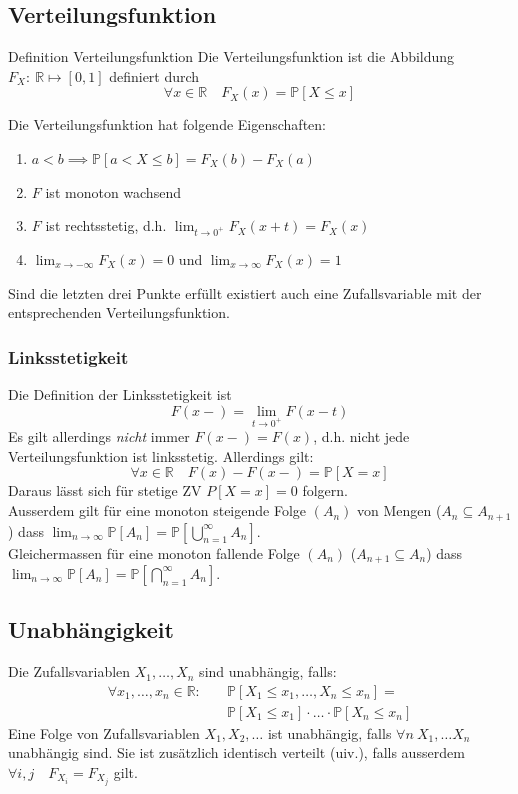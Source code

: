 \documentclass[a4paper,10pt]{article}
\def\R{\mathbb{R}}
\def\P{\mathbb{P}}
\begin{document}
\subsection{Verteilungsfunktion}
\begin{mainbox}{Definition Verteilungsfunktion}
	Die Verteilungsfunktion ist die Abbildung \(F_X: \ \R \mapsto [0,1]\) definiert durch
	\[\forall x \in \R \quad F_X(x) = \P[X \le x]\]
\end{mainbox}
Die Verteilungsfunktion hat folgende Eigenschaften:
\begin{enumerate}
	\item \(a < b \implies \P[a < X \le b] = F_X(b) - F_X(a)\)
	\item \(F\) ist monoton wachsend
	\item \(F\) ist rechtsstetig, d.h. \(\lim_{t \to 0^+} F_X(x+t) = F_X(x)\)
	\item \(\lim_{x\to - \infty} F_X(x) = 0\) und \(\lim_{x\to \infty} F_X(x) = 1\)
\end{enumerate}

Sind die letzten drei Punkte erfüllt existiert auch eine Zufallsvariable mit der entsprechenden Verteilungsfunktion.

\subsubsection*{Linksstetigkeit}
Die Definition der Linksstetigkeit ist
\[F(x-) = \lim_{t \to 0^+} F(x-t)\]
Es gilt allerdings \textit{nicht} immer \(F(x-) = F(x)\), d.h. nicht jede Verteilungsfunktion ist linksstetig. Allerdings gilt:
\[\forall x \in \R \quad F(x) - F(x-) = \P[X=x]\]
Daraus lässt sich für stetige ZV \(P[X=x] = 0\) folgern.\\
Ausserdem gilt für eine monoton steigende Folge $(A_n)$ von Mengen ($A_n \subseteq A_{n+1}$) dass $\lim_{n \to \infty} \P[A_n] = \P[\bigcup_{n=1}^\infty A_n]$.\\
Gleichermassen für eine monoton fallende Folge $(A_n)$ ($A_{n+1} \subseteq A_n$) dass $\lim_{n \to \infty} \P[A_n] = \P[\bigcap_{n=1}^\infty A_n]$.

\subsection{Unabhängigkeit}
Die Zufallsvariablen \(X_1, \ldots, X_n\) sind unabhängig, falls:
\begin{align*}
	\forall x_1, \ldots, x_n \in \R: \quad & \P[X_1 \le x_1, \ldots, X_n \le x_n] =             \\
	                                       & \P[X_1 \le x_1] \cdot \ldots \cdot \P[X_n \le x_n]
\end{align*}
Eine Folge von Zufallsvariablen \(X_1, X_2, \ldots\) ist unabhängig, falls \(
\forall n \ X_1, \ldots X_n\) unabhängig sind. Sie ist zusätzlich identisch verteilt (uiv.), falls ausserdem \(\forall i,j \quad F_{X_i} = F_{X_j}\) gilt.
\end{document}
